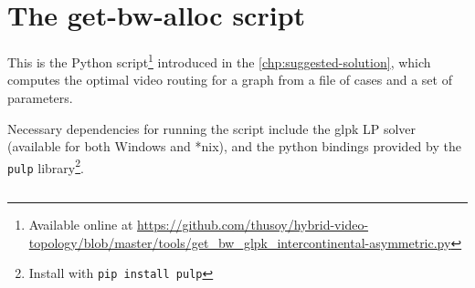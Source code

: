\chapter{The get-bw-alloc script}
\label{chp:get-bw-alloc}

This is the Python script\footnote{Available online at \url{https://github.com/thusoy/hybrid-video-topology/blob/master/tools/get_bw_glpk_intercontinental-asymmetric.py}} introduced in the \autoref{chp:suggested-solution}, which computes the optimal video routing for a graph from a file of cases and a set of parameters.

Necessary dependencies for running the script include the glpk LP solver (available for both Windows and *nix), and the python bindings provided by the \texttt{pulp} library\footnote{Install with \texttt{pip install pulp}}.

\inputminted[linenos,
               numbersep=5pt,
               frame=lines,
               framesep=2mm]{python}{tools/get_bw_glpk_intercontinental-asymmetric.py}
